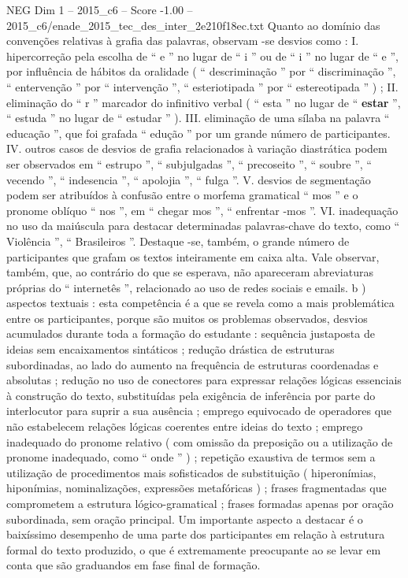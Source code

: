 \begin{textsample}{NEG Dim 1 – 2015\_c6 – Score -1.00 – 2015\_c6/enade\_2015\_tec\_des\_inter\_2e210f18ec.txt}
Quanto ao domínio das convenções relativas à grafia das palavras, observam -se desvios como : I. hipercorreção pela escolha de “ e ” no lugar de “ i ” ou de “ i ” no lugar de “ e ”, por influência de hábitos da oralidade ( “ descriminação ” por “ discriminação ”, “ entervenção ” por “ intervenção ”, “ esteriotipada ” por “ estereotipada ” ) ; II. eliminação do “ r ” marcador do infinitivo verbal ( “ esta ” no lugar de “ \textbf{estar} ”, “ estuda ” no lugar de “ estudar ” ).
III. eliminação de uma sílaba na palavra “ educação ”, que foi grafada “ edução ” por um grande número de participantes.
IV. outros casos de desvios de grafia relacionados à variação diastrática podem ser observados em “ estrupo ”, “ subjulgadas ”, “ precoseito ”, “ soubre ”, “ vecendo ”, “ indesencia ”, “ apolojia ”, “ fulga ”.
V. desvios de segmentação podem ser atribuídos à confusão entre o morfema gramatical “ mos ” e o pronome oblíquo “ nos ”, em “ chegar mos ”, “ enfrentar -mos ”.
VI. inadequação no uso da maiúscula para destacar determinadas palavras-chave do texto, como “ Violência ”, “ Brasileiros ”.
Destaque -se, também, o grande número de participantes que grafam os textos inteiramente em caixa alta.
Vale observar, também, que, ao contrário do que se esperava, não apareceram abreviaturas próprias do “ internetês ”, relacionado ao uso de redes sociais e emails. b ) aspectos textuais : esta competência é a que se revela como a mais problemática entre os participantes, porque são muitos os problemas observados, desvios acumulados durante toda a formação do estudante : sequência justaposta de ideias sem encaixamentos sintáticos ; redução drástica de estruturas subordinadas, ao lado do aumento na frequência de estruturas coordenadas e absolutas ; redução no uso de conectores para expressar relações lógicas essenciais à construção do texto, substituídas pela exigência de inferência por parte do interlocutor para suprir a sua ausência ; emprego equivocado de operadores que não estabelecem relações lógicas coerentes entre ideias do texto ; emprego inadequado do pronome relativo ( com omissão da preposição ou a utilização de pronome inadequado, como “ onde ” ) ; repetição exaustiva de termos sem a utilização de procedimentos mais sofisticados de substituição ( hiperonímias, hiponímias, nominalizações, expressões metafóricas ) ; frases fragmentadas que comprometem a estrutura lógico-gramatical ; frases formadas apenas por oração subordinada, sem oração principal.
Um importante aspecto a destacar é o baixíssimo desempenho de uma parte dos participantes em relação à estrutura formal do texto produzido, o que é extremamente preocupante ao se levar em conta que são graduandos em fase final de formação.

\end{textsample}
